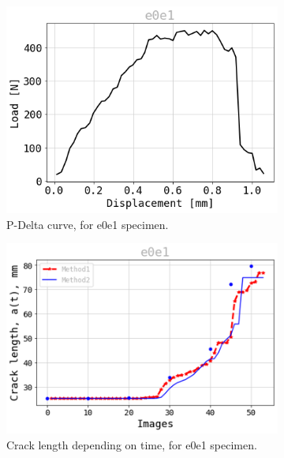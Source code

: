 \documentclass[3p,times,procedia]{elsarticle}
\begin{document}
\begin{figure}[htbp]
	\centering
	\begin{subfigure}[b]{0.4\textwidth}
		\centering
		\includegraphics[width=\textwidth]{Figures/P_e0e1}
		\caption{P-Delta curve, for e0e1 specimen.}
		\label{fig:image1}
	\end{subfigure}
	\hfill
	\begin{subfigure}[b]{0.4\textwidth}
		\centering
		\includegraphics[width=\textwidth]{Figures/a_e0e1}
		\caption{Crack length depending on time, for e0e1 specimen.}
		\label{fig:image2}
	\end{subfigure}
	\\
	\begin{subfigure}[b]{0.4\textwidth}
		\centering

\end{subfigure}
\end{figure}
\end{document}
